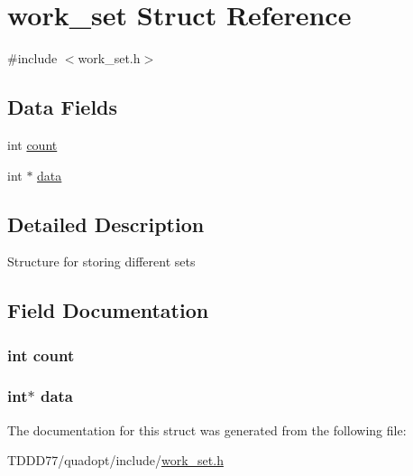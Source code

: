 \hypertarget{structwork__set}{}\section{work\+\_\+set Struct Reference}
\label{structwork__set}


{\ttfamily \#include $<$work\+\_\+set.\+h$>$}

\subsection*{Data Fields}
\begin{DoxyCompactItemize}
\item 
int \hyperlink{structwork__set_ad43c3812e6d13e0518d9f8b8f463ffcf}{count}
\item 
int $\ast$ \hyperlink{structwork__set_ac103627c1ad15cbec2f22d0abe6d54b6}{data}
\end{DoxyCompactItemize}


\subsection{Detailed Description}
Structure for storing different sets 

\subsection{Field Documentation}
\hypertarget{structwork__set_ad43c3812e6d13e0518d9f8b8f463ffcf}{}
\subsubsection[{count}]{\setlength{\rightskip}{0pt plus 5cm}int count}\label{structwork__set_ad43c3812e6d13e0518d9f8b8f463ffcf}
\hypertarget{structwork__set_ac103627c1ad15cbec2f22d0abe6d54b6}{}
\subsubsection[{data}]{\setlength{\rightskip}{0pt plus 5cm}int$\ast$ data}\label{structwork__set_ac103627c1ad15cbec2f22d0abe6d54b6}


The documentation for this struct was generated from the following file\+:\begin{DoxyCompactItemize}
\item 
T\+D\+D\+D77/quadopt/include/\hyperlink{work__set_8h}{work\+\_\+set.\+h}\end{DoxyCompactItemize}
